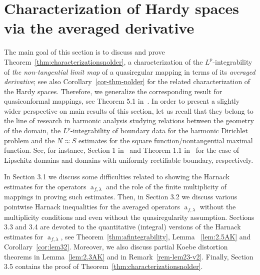 \documentclass[11pt,a4paper,reqno]{amsart}
\theoremstyle{definition}
\renewcommand{\a}{\operatorname{a}}
\numberwithin{komcounter}{section}
\begin{document}
\section{Characterization of Hardy spaces via the averaged derivative}

The main goal of this section is to discuss and prove Theorem~\ref{thm:characterizationsnolder}, a characterization of the $L^p$-integrability of \emph{the non-tangential limit map} of a quasiregular mapping in terms of its \emph{averaged derivative}; see also Corollary~\ref{cor-thm-nolder} for the related characterization of the Hardy spaces. Therefore, we generalize the corresponding result for quasiconformal mappings, see Theorem 5.1 in~\cite{ak}. In order to present a slightly wider perspective on main results of this section, let us recall that they belong to the line of research in harmonic analysis studying relations between the geometry of the domain, the $L^p$-integrability of boundary data for the harmonic Dirichlet problem and the $N\approx S$ estimates for the square function/nontangential maximal function. See, for instance, Section 1 in~\cite{hmm} and Theorem 1.1 in~\cite{az} for the case of Lipschitz domains and domains with uniformly rectifiable boundary, respectively.

In Section 3.1 we discuss some difficulties related to showing the Harnack estimates for the operators $\a_{f,\lambda}$ and the role of the finite multiplicity of mappings in proving such estimates. Then, in Section 3.2 we discuss various pointwise Harnack inequalities for the averaged operators $\a_{f,\lambda}$ without the multiplicity conditions and even without the quasiregularity assumption. Sections 3.3 and 3.4 are devoted to the quantitative (integral) versions of the Harnack estimates for $\a_{f,\lambda}$, see Theorem~\ref{thm:afintegrability}, Lemma ~\ref{lem:2.5AK} and Corollary~\ref{cor:lem32}. Moreover, we also discuss partial Koebe distortion theorems in Lemma~\ref{lem:2.3AK} and in Remark~\ref{rem-lem23-v2}. Finally, Section 3.5 contains the proof of Theorem~\ref{thm:characterizationsnolder}.
\end{document}
